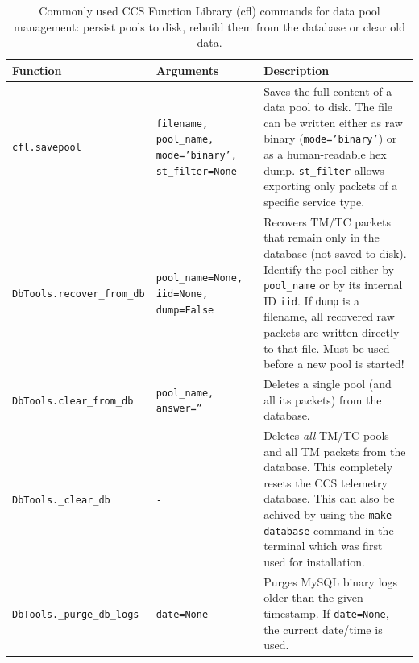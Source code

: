 \begin{table}[h!]
\centering
\renewcommand{\arraystretch}{1.3}
\setlength{\tabcolsep}{8pt}
\begin{tabular}{p{4cm} p{5cm} p{6cm}}
\hline
\textbf{Function} & \textbf{Arguments} & \textbf{Description} \\ 
\hline

\texttt{cfl.savepool} & \texttt{filename, pool\_name, mode='binary', st\_filter=None} &
Saves the full content of a data pool to disk.  
The file can be written either as raw binary (\texttt{mode='binary'}) or as a human-readable hex dump.  
\texttt{st\_filter} allows exporting only packets of a specific service type.  \\

\texttt{DbTools.recover\_from\_db} & \texttt{pool\_name=None, iid=None, dump=False} &
Recovers TM/TC packets that remain only in the database (not saved to disk).  
Identify the pool either by \texttt{pool\_name} or by its internal ID \texttt{iid}.  
If \texttt{dump} is a filename, all recovered raw packets are written directly to that file.  
Must be used before a new pool is started! \\

\texttt{DbTools.clear\_from\_db} & \texttt{pool\_name, answer=''} &
Deletes a single pool (and all its packets) from the database. \\

\texttt{DbTools.\_clear\_db} & \texttt{-} &
Deletes \emph{all} TM/TC pools and all TM packets from the database.  
This completely resets the CCS telemetry database. This can also be achived by using the \texttt{make database} command in the terminal which was first used for installation. \\

\texttt{DbTools.\_purge\_db\_logs} & \texttt{date=None} &
Purges MySQL binary logs older than the given timestamp.  
If \texttt{date=None}, the current date/time is used. \\
\hline

\hline
\end{tabular}
\caption{Commonly used CCS Function Library (cfl) commands for data pool management:  persist pools to disk, rebuild them from the database or clear old data.}
\end{table}




